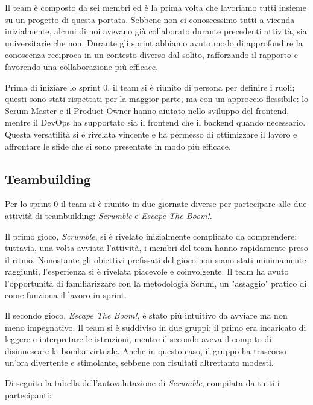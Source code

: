 \documentclass{article}
\begin{document}
Il team è composto da sei membri ed è la prima volta che lavoriamo tutti insieme su un progetto di questa portata. Sebbene non ci 
conoscessimo tutti a vicenda inizialmente, alcuni di noi avevano già collaborato durante precedenti attività, sia universitarie 
che non. Durante gli sprint abbiamo avuto modo di approfondire la conoscenza reciproca in un contesto diverso dal solito, rafforzando 
il rapporto e favorendo una collaborazione più efficace.

Prima di iniziare lo sprint 0, il team si è riunito di persona per definire i ruoli; questi sono stati rispettati per la maggior parte, 
ma con un approccio flessibile: lo Scrum Master e il Product Owner hanno aiutato nello sviluppo del frontend, mentre il DevOps ha supportato 
sia il frontend che il backend quando necessario. Questa versatilità si è rivelata vincente e ha permesso di ottimizzare il lavoro e 
affrontare le sfide che si sono presentate in modo più efficace.

\subsection{Teambuilding} \label{sec:teambuilding}

Per lo sprint 0 il team si è riunito in due giornate diverse per partecipare alle due attività di teambuilding: \textit{Scrumble} e 
\textit{Escape The Boom!}.

Il primo gioco, \textit{Scrumble}, si è rivelato inizialmente complicato da comprendere; tuttavia, una volta avviata l'attività, i membri 
del team hanno rapidamente preso il ritmo. Nonostante gli obiettivi prefissati del gioco non siano stati minimamente raggiunti, l'esperienza 
si è rivelata piacevole e coinvolgente. Il team ha avuto l'opportunità di familiarizzare con la metodologia Scrum, un "assaggio" pratico 
di come funziona il lavoro in sprint.

Il secondo gioco, \textit{Escape The Boom!}, è stato più intuitivo da avviare ma non meno impegnativo. Il team si è suddiviso in due gruppi: 
il primo era incaricato di leggere e interpretare le istruzioni, mentre il secondo aveva il compito di disinnescare la bomba virtuale. Anche 
in questo caso, il gruppo ha trascorso un'ora divertente e stimolante, sebbene con risultati altrettanto modesti.

Di seguito la tabella dell'autovalutazione di \textit{Scrumble}, compilata da tutti i partecipanti:
\end{document}

